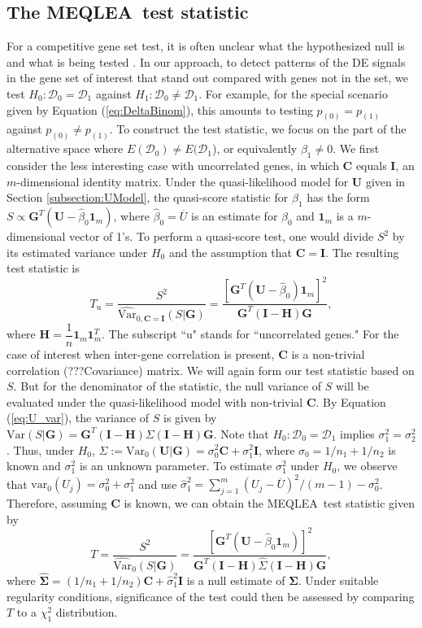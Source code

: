 \documentclass[useAMS,usenatbib, galley]{biom}
\newcommand{\OurMethod}{MEQLEA}
\begin{document}
	\subsection{The \OurMethod~test statistic}\label{subsection:MEQL}
	For a competitive gene set test, it is often unclear what the hypothesized null is and what is being tested \citep{barry2008statistical,wu2012camera}. In our approach, to detect patterns of the DE signals in the gene set of interest that stand out compared with genes not in the set, we test $H_0: \mathscr{D}_0=\mathscr{D}_1$ against $H_1: \mathscr{D}_0\ne\mathscr{D}_1$. For example, for the special scenario given by Equation (\ref{eq:DeltaBinom}), this amounts to testing $p_{(0)}=p_{(1)}$ against $p_{(0)}\ne p_{(1)}$.
	To construct the test statistic, we focus on the part of the alternative space where $E(\mathscr{D}_0)\ne E(\mathscr{D}_1$), or equivalently $\beta_1\ne 0$. We first consider the less interesting case with uncorrelated genes, in which $\bm C$ equals $\bm I$, an $m$-dimensional identity matrix. Under the quasi-likelihood model for $\bm U$ given in Section \ref{subsection:UModel},  the quasi-score statistic for $\beta_1$ has the form $S \propto \bm G^T(\bm U-\hat\beta_0\bm 1_m)$, where $\hat\beta_0=\overline{U}$ is an estimate for $\beta_0$ and $\bm 1_m$ is a $m$-dimensional vector of 1's. To perform a quasi-score test, one would divide $S^2$ by its estimated variance under $H_0$ and the assumption that $\bm C=\bm I$. The resulting test statistic is 
	\begin{equation}
		T_{\text{u}} = \dfrac{S^2}{\widehat{\mbox{Var}}_{0, \bm C=\bm I}(S|\bm G)} = \dfrac{[\bm G^T(\bm U-\hat\beta_0)\bm 1_m]^2}{\bm G^T(\bm I-\bm H)\bm G}, 
	\end{equation}
	where $\bm H = \dfrac{1}{n}\bm 1_m\bm 1_m^T$. The subscript ``u" stands for ``uncorrelated genes." For the case of interest when inter-gene correlation is present, $\bm C$ is a non-trivial correlation (???Covariance) matrix. We will again form our test statistic based on $S$. But for the denominator of the statistic, the null variance of $S$ will be evaluated under the quasi-likelihood model with non-trivial $\bm C$. By Equation (\ref{eq:U_var}), the variance of $S$ is given by $\mbox{Var}(S|\bm G) = \bm G^T(\bm I-\bm H)\Sigma(\bm I-\bm H)\bm G$. Note that $H_0: \mathscr{D}_0=\mathscr{D}_1$ implies $\sigma_1^2=\sigma_2^2$. Thus, under $H_0$, $\Sigma:=\mbox{Var}_{0}(\bm U|\bm G)=\sigma_0^2\bm C+\sigma_1^2\bm I$, where $\sigma_0=1/n_1+1/n_2$ is known and $\sigma_1^2$ is an unknown parameter. To estimate $\sigma_1^2$ under $H_0$, we observe that $\mbox{var}_{0}(U_j)=\sigma_0^2+\sigma_1^2$ and use $\hat\sigma_1^2=\sum_{j=1}^m(U_j-\overline{U})^2/(m-1)-\sigma_0^2$. Therefore, assuming $\bm C$ is known, we can obtain the \OurMethod~test statistic given by
	\begin{equation}
		T = \dfrac{S^2}{\widehat{\mbox{Var}}_{0}(S|\bm G)} = \dfrac{[\bm G^T(\bm U-\hat\beta_0\bm 1_m)]^2}{\bm G^T(\bm I-\bm H)\hat\Sigma(\bm I-\bm H)\bm G}, 
	\end{equation}
	where $\bm \hat\Sigma=(1/n_1+1/n_2)\bm C+\hat\sigma_1^2\bm I$ is a null estimate of $\bm \Sigma$. Under suitable regularity conditions, significance of the test could then be assessed by comparing $T$ to a $\chi^2_1$ distribution.
	
\end{document}
